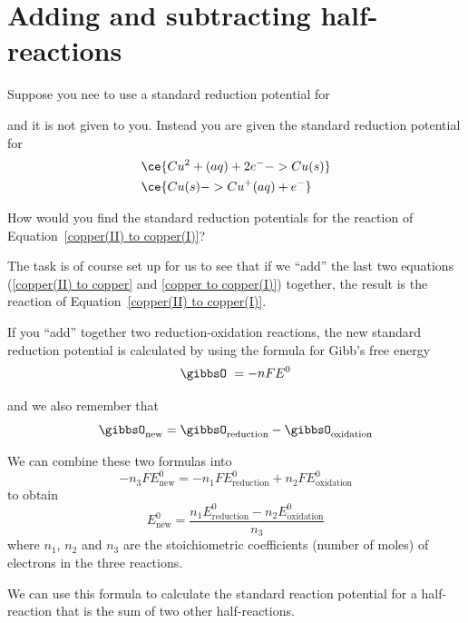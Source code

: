 \documentclass[../mit-general-chemistry.tex]{subfiles}
\begin{document}
\section{Adding and subtracting half-reactions}



Suppose you nee to use a standard reduction potential for


and it is not given to you. Instead you are given the standard
reduction potential for
\begin{align}
  &\ce{Cu^2+(aq) + 2e^- -> Cu(s)\label{copper(II) to copper}}\\
  &\ce{Cu(s) -> Cu^+(aq) + e^-\label{copper to copper(I)}}
\end{align}

How would you find the standard reduction potentials for
the reaction of Equation~\ref{copper(II) to copper(I)}?

The task is of course set up for us to see that if we ``add'' the last
two equations (\ref{copper(II) to copper} and \ref{copper to
  copper(I)}) together, the result is the reaction of
Equation~\ref{copper(II) to copper(I)}.

If you ``add'' together two reduction-oxidation reactions, the new
standard reduction potential is calculated by using the formula for
Gibb's free energy
\begin{equation*}
  \gibbsO\ = -nFE^0
\end{equation*}

and we also remember that
\begin{equation*}
  \gibbsO_{\text{new}} = \gibbsO_{\text{reduction}} - \gibbsO_{\text{oxidation}}
\end{equation*}

We can combine these two formulas into
\begin{equation}
  -n_3FE^0_{\text{new}} = -n_1FE^0_{\text{reduction}} + n_2FE^0_{\text{oxidation}}
\end{equation}
to obtain
\begin{equation}\label{eq:E_new}
  E^0_{\text{new}} = \frac{n_1E^0_{\text{reduction}} - n_2E^0_{\text{oxidation}}}{n_3}
\end{equation}
where $n_1$, $n_2$ and $n_3$ are the stoichiometric coefficients
(number of moles) of electrons in the three reactions.

We can use this formula to calculate the standard reaction potential
for a half-reaction that is the sum of two other half-reactions.
\end{document}
